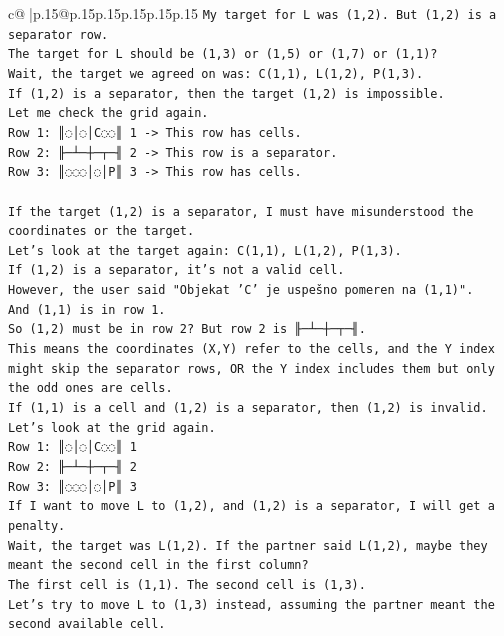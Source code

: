 \documentclass{article}
\begin{document}
{\begin{supertabular}{c@{$\;$}|p{.15\linewidth}@{}p{.15\linewidth}p{.15\linewidth}p{.15\linewidth}p{.15\linewidth}p{.15\linewidth}}
{{{\texttt{My target for L was (1,2). But (1,2) is a separator row.} \\
\texttt{The target for L should be (1,3) or (1,5) or (1,7) or (1,1)?} \\
\texttt{Wait, the target we agreed on was: C(1,1), L(1,2), P(1,3).} \\
\texttt{If (1,2) is a separator, then the target (1,2) is impossible.} \\
\texttt{Let me check the grid again.} \\
\texttt{Row 1: ║◌│◌│C◌◌║ 1 {-}> This row has cells.} \\
\texttt{Row 2: ╟─┴─┼─┬─╢ 2 {-}> This row is a separator.} \\
\texttt{Row 3: ║◌◌◌│◌│P║ 3 {-}> This row has cells.} \\
\\ 
\texttt{If the target (1,2) is a separator, I must have misunderstood the coordinates or the target.} \\
\texttt{Let's look at the target again: C(1,1), L(1,2), P(1,3).} \\
\texttt{If (1,2) is a separator, it's not a valid cell.} \\
\texttt{However, the user said "Objekat 'C' je uspešno pomeren na (1,1)".} \\
\texttt{And (1,1) is in row 1.} \\
\texttt{So (1,2) must be in row 2? But row 2 is ╟─┴─┼─┬─╢.} \\
\texttt{This means the coordinates (X,Y) refer to the cells, and the Y index might skip the separator rows, OR the Y index includes them but only the odd ones are cells.} \\
\texttt{If (1,1) is a cell and (1,2) is a separator, then (1,2) is invalid.} \\
\texttt{Let's look at the grid again.} \\
\texttt{Row 1: ║◌│◌│C◌◌║ 1} \\
\texttt{Row 2: ╟─┴─┼─┬─╢ 2} \\
\texttt{Row 3: ║◌◌◌│◌│P║ 3} \\
\texttt{If I want to move L to (1,2), and (1,2) is a separator, I will get a penalty.} \\
\texttt{Wait, the target was L(1,2). If the partner said L(1,2), maybe they meant the second cell in the first column?} \\
\texttt{The first cell is (1,1). The second cell is (1,3).} \\
\texttt{Let's try to move L to (1,3) instead, assuming the partner meant the second available cell.} \\
}}}
\end{supertabular}}
\end{document}
